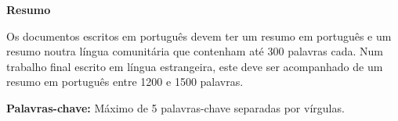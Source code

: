 
\vspace*{2cm}
\begin{center} \Large \bf Resumo
\end{center}
\vspace*{1cm} \setlength{\baselineskip}{0.6cm}

Os documentos escritos em português devem ter um resumo em português e um resumo noutra língua comunitária que contenham até 300 palavras cada. Num  trabalho final escrito em língua estrangeira, este deve ser acompanhado de um resumo em português entre 1200 e 1500 palavras.


\vfill

\begin{flushleft}
\textbf{Palavras-chave:}
Máximo de 5 palavras-chave separadas por vírgulas.
\end{flushleft}

